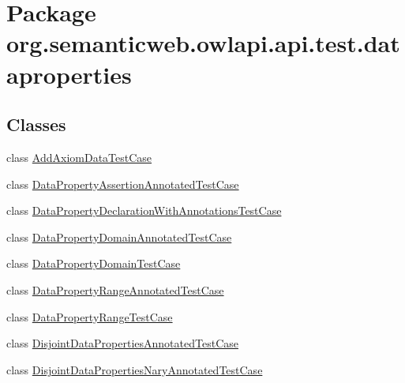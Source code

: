 \hypertarget{namespaceorg_1_1semanticweb_1_1owlapi_1_1api_1_1test_1_1dataproperties}{\section{Package org.\-semanticweb.\-owlapi.\-api.\-test.\-dataproperties}
\label{namespaceorg_1_1semanticweb_1_1owlapi_1_1api_1_1test_1_1dataproperties}
}
\subsection*{Classes}
\begin{DoxyCompactItemize}
\item 
class \hyperlink{classorg_1_1semanticweb_1_1owlapi_1_1api_1_1test_1_1dataproperties_1_1_add_axiom_data_test_case}{Add\-Axiom\-Data\-Test\-Case}
\item 
class \hyperlink{classorg_1_1semanticweb_1_1owlapi_1_1api_1_1test_1_1dataproperties_1_1_data_property_assertion_annotated_test_case}{Data\-Property\-Assertion\-Annotated\-Test\-Case}
\item 
class \hyperlink{classorg_1_1semanticweb_1_1owlapi_1_1api_1_1test_1_1dataproperties_1_1_data_property_declaration_with_annotations_test_case}{Data\-Property\-Declaration\-With\-Annotations\-Test\-Case}
\item 
class \hyperlink{classorg_1_1semanticweb_1_1owlapi_1_1api_1_1test_1_1dataproperties_1_1_data_property_domain_annotated_test_case}{Data\-Property\-Domain\-Annotated\-Test\-Case}
\item 
class \hyperlink{classorg_1_1semanticweb_1_1owlapi_1_1api_1_1test_1_1dataproperties_1_1_data_property_domain_test_case}{Data\-Property\-Domain\-Test\-Case}
\item 
class \hyperlink{classorg_1_1semanticweb_1_1owlapi_1_1api_1_1test_1_1dataproperties_1_1_data_property_range_annotated_test_case}{Data\-Property\-Range\-Annotated\-Test\-Case}
\item 
class \hyperlink{classorg_1_1semanticweb_1_1owlapi_1_1api_1_1test_1_1dataproperties_1_1_data_property_range_test_case}{Data\-Property\-Range\-Test\-Case}
\item 
class \hyperlink{classorg_1_1semanticweb_1_1owlapi_1_1api_1_1test_1_1dataproperties_1_1_disjoint_data_properties_annotated_test_case}{Disjoint\-Data\-Properties\-Annotated\-Test\-Case}
\item 
class \hyperlink{classorg_1_1semanticweb_1_1owlapi_1_1api_1_1test_1_1dataproperties_1_1_disjoint_data_properties_nary_annotated_test_case}{Disjoint\-Data\-Properties\-Nary\-Annotated\-Test\-Case}

\end{DoxyCompactItemize}
